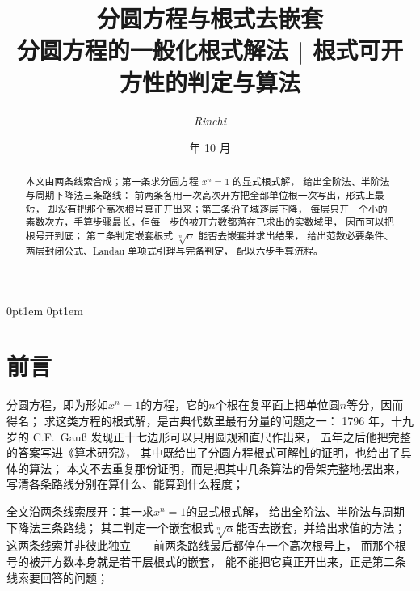 \documentclass[UTF8,a4paper,11pt]{ctexart}
\title{\textbf{\huge{分圆方程与根式去嵌套}}\\[6pt]
\large{分圆方程的一般化根式解法 \;|\; 根式可开方性的判定与算法}}
\author{\large{\textit{Rinchi}}}
\date{\kaishu 2026 年 10 月}
\begin{document}
\theoremstyle{definition}
\newtheorem*{solve}{解}
\newtheorem*{syoumei}{证}
{\topsep}{\topsep}{\itshape}{0pt}{\bfseries}{}{1em}
{}
{\topsep}{\topsep}{\normalfont}{0pt}{\bfseries}{}{1em}
{}
\theoremstyle{myplain}
\newtheorem{theorem}{定理}[section]
\newtheorem{proposition}[theorem]{命题}
\newtheorem{lemma}[theorem]{引理}
\newtheorem{corollary}[theorem]{推论}
\theoremstyle{mydefinition}
\newtheorem{definition}[theorem]{定义}
\newtheorem{example}[theorem]{例}
\newtheorem{remark}[theorem]{注}
\newtheorem{notation}[theorem]{记号}
\newtheorem{convention}[theorem]{约定}
\rmfamily
\maketitle
\begin{abstract}
本文由两条线索合成；第一条求分圆方程 $x^{n}=1$ 的显式根式解，
给出全阶法、半阶法与周期下降法三条路线：
前两条各用一次高次开方把全部单位根一次写出，形式上最短，
却没有把那个高次根号真正开出来；第三条沿子域逐层下降，
每层只开一个小的素数次方，手算步骤最长，但每一步的被开方数都落在已求出的实数域里，
因而可以把根号开到底；
第二条判定嵌套根式 $\sqrt[n]{\alpha}$ 能否去嵌套并求出结果，
给出范数必要条件、两层封闭公式、Landau 单项式引理与完备判定，
配以六步手算流程。
\end{abstract}
\tableofcontents
\pagebreak

\section*{前言}
分圆方程，即为形如$x^{n}=1$的方程，它的$n$个根在复平面上把单位圆$n$等分，因而得名；
求这类方程的根式解，是古典代数里最有分量的问题之一：
1796 年，十九岁的 C.F.\ Gauß 发现正十七边形可以只用圆规和直尺作出来，
五年之后他把完整的答案写进《算术研究》，
其中既给出了分圆方程根式可解性的证明，也给出了具体的算法；
本文不去重复那份证明，而是把其中几条算法的骨架完整地摆出来，
写清各条路线分别在算什么、能算到什么程度；\par

全文沿两条线索展开：其一求$x^{n}=1$的显式根式解，
给出全阶法、半阶法与周期下降法三条路线；
其二判定一个嵌套根式$\sqrt[n]{\alpha}$能否去嵌套，并给出求值的方法；
这两条线索并非彼此独立——前两条路线最后都停在一个高次根号上，
而那个根号的被开方数本身就是若干层根式的嵌套，
能不能把它真正开出来，正是第二条线索要回答的问题；\par
\end{document}

